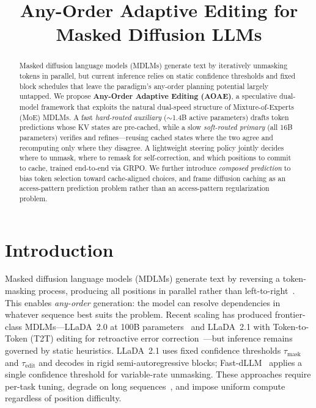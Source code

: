 \documentclass[11pt]{article}
\title{Any-Order Adaptive Editing for Masked Diffusion LLMs}
\author{}
\date{}
\begin{document}
\maketitle

\begin{abstract}
Masked diffusion language models (MDLMs) generate text by iteratively unmasking tokens in parallel, but current inference relies on static confidence thresholds and fixed block schedules that leave the paradigm's any-order planning potential largely untapped.
We propose \textbf{Any-Order Adaptive Editing (AOAE)}, a speculative dual-model framework that exploits the natural dual-speed structure of Mixture-of-Experts (MoE) MDLMs.
A fast \emph{hard-routed auxiliary} (${\sim}$1.4B active parameters) drafts token predictions whose KV states are pre-cached, while a slow \emph{soft-routed primary} (all 16B parameters) verifies and refines---reusing cached states where the two agree and recomputing only where they disagree.
A lightweight steering policy jointly decides where to unmask, where to remask for self-correction, and which positions to commit to cache, trained end-to-end via GRPO. We further introduce \emph{composed prediction} to bias token selection toward cache-aligned choices, and frame diffusion caching as an access-pattern prediction problem rather than an access-pattern regularization problem.
\end{abstract}

\section{Introduction}
\label{sec:intro}

Masked diffusion language models (MDLMs) generate text by reversing a token-masking process, producing all positions in parallel rather than left-to-right~\cite{austin2021structured,sahoo2024simple,shi2024simplified,lou2024discrete}.
This enables \emph{any-order} generation: the model can resolve dependencies in whatever sequence best suits the problem.
Recent scaling has produced frontier-class MDLMs---LLaDA~2.0 at 100B parameters~\cite{nie2025llada2} and LLaDA~2.1 with Token-to-Token (T2T) editing for retroactive error correction~\cite{llada21}---but inference remains governed by static heuristics.
LLaDA~2.1 uses fixed confidence thresholds $\tau_{\text{mask}}$ and $\tau_{\text{edit}}$ and decodes in rigid semi-autoregressive blocks; Fast-dLLM~\cite{wu2025fastdllm} applies a single confidence threshold for variable-rate unmasking.
These approaches require per-task tuning, degrade on long sequences~\cite{jazbec2025learning}, and impose uniform compute regardless of position difficulty.
\end{document}
